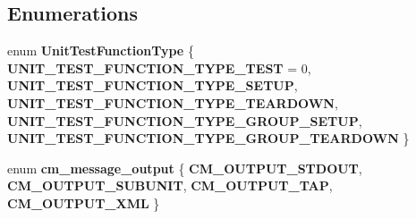 \subsection*{Enumerations}
\begin{DoxyCompactItemize}
\item 
\mbox{\label{group__cmocka_gacc1f84b55e26f5e7f8c1ad2ade44920b}} 
enum {\bfseries Unit\+Test\+Function\+Type} \{ \newline
{\bfseries U\+N\+I\+T\+\_\+\+T\+E\+S\+T\+\_\+\+F\+U\+N\+C\+T\+I\+O\+N\+\_\+\+T\+Y\+P\+E\+\_\+\+T\+E\+ST} = 0, 
{\bfseries U\+N\+I\+T\+\_\+\+T\+E\+S\+T\+\_\+\+F\+U\+N\+C\+T\+I\+O\+N\+\_\+\+T\+Y\+P\+E\+\_\+\+S\+E\+T\+UP}, 
{\bfseries U\+N\+I\+T\+\_\+\+T\+E\+S\+T\+\_\+\+F\+U\+N\+C\+T\+I\+O\+N\+\_\+\+T\+Y\+P\+E\+\_\+\+T\+E\+A\+R\+D\+O\+WN}, 
{\bfseries U\+N\+I\+T\+\_\+\+T\+E\+S\+T\+\_\+\+F\+U\+N\+C\+T\+I\+O\+N\+\_\+\+T\+Y\+P\+E\+\_\+\+G\+R\+O\+U\+P\+\_\+\+S\+E\+T\+UP}, 
\newline
{\bfseries U\+N\+I\+T\+\_\+\+T\+E\+S\+T\+\_\+\+F\+U\+N\+C\+T\+I\+O\+N\+\_\+\+T\+Y\+P\+E\+\_\+\+G\+R\+O\+U\+P\+\_\+\+T\+E\+A\+R\+D\+O\+WN}
 \}
\item 
\mbox{\label{group__cmocka_gab0bc6b8252e7840ff5738477dc7a97ca}} 
enum {\bfseries cm\+\_\+message\+\_\+output} \{ {\bfseries C\+M\+\_\+\+O\+U\+T\+P\+U\+T\+\_\+\+S\+T\+D\+O\+UT}, 
{\bfseries C\+M\+\_\+\+O\+U\+T\+P\+U\+T\+\_\+\+S\+U\+B\+U\+N\+IT}, 
{\bfseries C\+M\+\_\+\+O\+U\+T\+P\+U\+T\+\_\+\+T\+AP}, 
{\bfseries C\+M\+\_\+\+O\+U\+T\+P\+U\+T\+\_\+\+X\+ML}
 \}
\end{DoxyCompactItemize}
